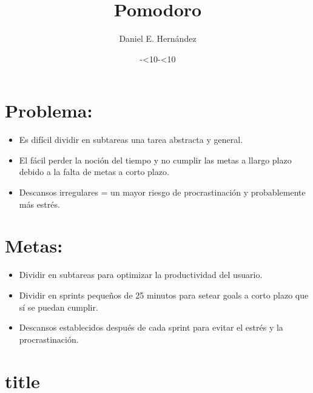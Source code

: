 \documentclass[]{article}
\title{\textbf{Pomodoro}}
\author{Daniel E. Hernández}
\date{\the\year-\ifnum\month<10\relax0\fi\the\month-\ifnum\day<10\relax0\fi\the\day}
\begin{document}
\maketitle

\section{Problema: }
\begin{itemize}
	\item Es difícil dividir en subtareas una tarea abstracta y general.
	\item El fácil perder la noción del tiempo y no cumplir las metas a llargo plazo debido a la falta de metas a corto plazo.
	\item Descansos irregulares = un mayor riesgo de procrastinación y probablemente más estrés.
\end{itemize}

\section{Metas: }
\begin{itemize}
	\item Dividir en subtareas para optimizar la productividad del usuario.
	
	\item Dividir en sprints pequeños de 25 minutos para setear goals a corto plazo que sí se puedan cumplir.
	
	\item Descansos establecidos después de cada sprint para evitar el estrés y la procrastinación.
\end{itemize}

\section{title}
\end{document}
